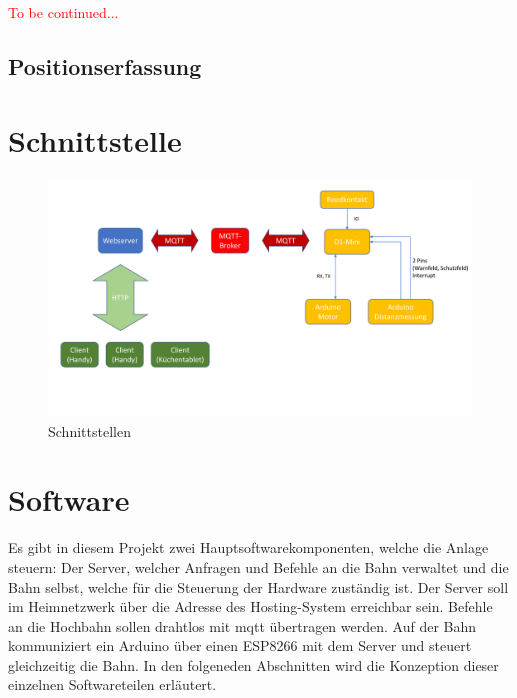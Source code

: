 \textcolor{red}{To be continued...}



\subsection{Positionserfassung}
\newpage
\section{Schnittstelle}

\begin{figure}[h]
	\centering
	\includegraphics[width=17cm]{schnittstellen.pdf}
	\caption{Schnittstellen}
	\label{pic:schnittstellen}
\end{figure}


\section{Software}
Es gibt in diesem Projekt zwei Hauptsoftwarekomponenten, welche die Anlage steuern: Der Server, welcher Anfragen und Befehle an die Bahn verwaltet und die Bahn selbst,
welche für die Steuerung der Hardware zuständig ist. Der Server soll im Heimnetzwerk über die Adresse des Hosting-System erreichbar sein. Befehle an die Hochbahn sollen drahtlos mit \acrshort{mqtt} übertragen werden.
Auf der Bahn kommuniziert ein Arduino über einen ESP8266 mit dem Server und steuert gleichzeitig die Bahn. In den folgeneden Abschnitten wird die Konzeption dieser einzelnen Softwareteilen erläutert.

